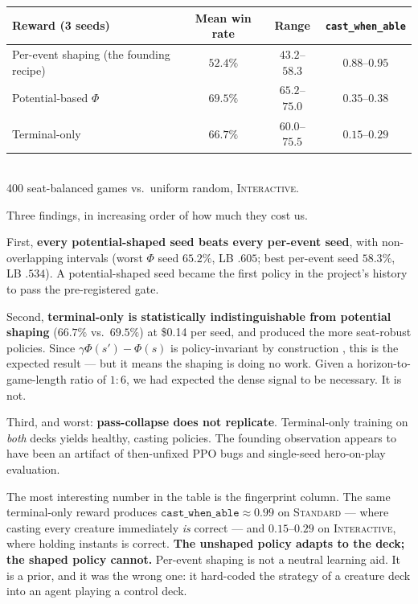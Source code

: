 \documentclass[11pt]{article}
\newcommand{\stddeck}{\textsc{Standard}}
\newcommand{\intdeck}{\textsc{Interactive}}
\begin{document}
\begin{center}\small
\begin{tabular}{lccc}
\toprule
Reward (3 seeds) & Mean win rate & Range & \texttt{cast\_when\_able} \\
\midrule
Per-event shaping (the founding recipe) & $52.4\%$ & $43.2$--$58.3$ & $0.88$--$0.95$ \\
Potential-based $\Phi$                   & $\mathbf{69.5\%}$ & $65.2$--$75.0$ & $0.35$--$0.38$ \\
Terminal-only                            & $66.7\%$ & $60.0$--$75.5$ & $0.15$--$0.29$ \\
\bottomrule
\end{tabular}\\[2pt]
{\footnotesize 400 seat-balanced games vs.\ uniform random, \intdeck.}
\end{center}

Three findings, in increasing order of how much they cost us.

First, \textbf{every potential-shaped seed beats every per-event seed}, with non-overlapping intervals (worst $\Phi$ seed $65.2\%$, LB $.605$; best per-event seed $58.3\%$, LB $.534$). A potential-shaped seed became the first policy in the project's history to pass the pre-registered gate.

Second, \textbf{terminal-only is statistically indistinguishable from potential shaping} ($66.7\%$ vs.\ $69.5\%$) at \$0.14 per seed, and produced the more seat-robust policies. Since $\gamma\Phi(s')-\Phi(s)$ is policy-invariant by construction \citep{ng1999shaping}, this is the expected result --- but it means the shaping is doing no work. Given a horizon-to-game-length ratio of $1{:}6$, we had expected the dense signal to be necessary. It is not.

Third, and worst: \textbf{pass-collapse does not replicate}. Terminal-only training on \emph{both} decks yields healthy, casting policies. The founding observation appears to have been an artifact of then-unfixed PPO bugs and single-seed hero-on-play evaluation.

The most interesting number in the table is the fingerprint column. The same terminal-only reward produces $\texttt{cast\_when\_able}\approx0.99$ on \stddeck{} --- where casting every creature immediately \emph{is} correct --- and $0.15$--$0.29$ on \intdeck, where holding instants is correct. \textbf{The unshaped policy adapts to the deck; the shaped policy cannot.} Per-event shaping is not a neutral learning aid. It is a prior, and it was the wrong one: it hard-coded the strategy of a creature deck into an agent playing a control deck.
\end{document}
